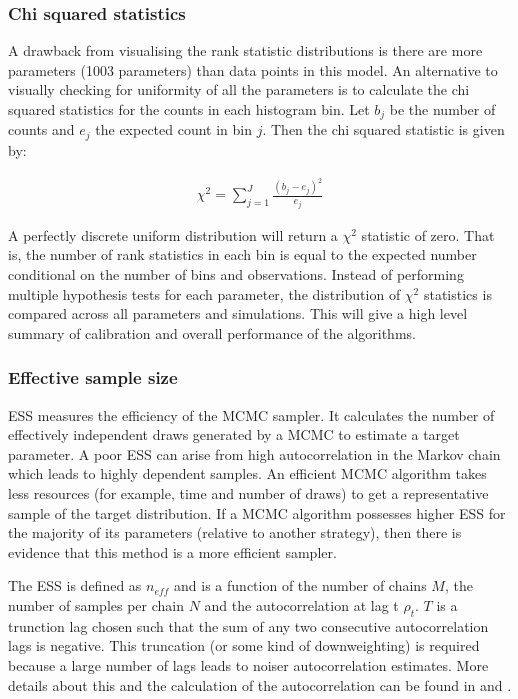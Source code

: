 \documentclass[12pt, a4paper]{article}
\begin{document}
            \subsubsection{Chi squared statistics}
            A drawback from visualising the rank statistic distributions is there are more parameters (1003 parameters) than data points in this model. An alternative to visually checking for uniformity of all the parameters is to calculate the chi squared statistics for the counts in each histogram bin. Let $b_j$ be the number of counts and $e_j$ the expected count in bin $j$. Then the chi squared statistic is given by:
            
            $$
            \begin{aligned}
            \chi^2 = \sum_{j=1}^J \frac{(b_{j} - e_{j})^2}{e_j}
            \end{aligned}
            $$
            
            A perfectly discrete uniform distribution will return a $\chi^2$ statistic of zero. That is, the number of rank statistics in each bin is equal to the expected number conditional on the number of bins and observations. Instead of performing multiple hypothesis tests for each parameter, the distribution of $\chi^2$ statistics is compared across all parameters and simulations. This will give a high level summary of calibration and overall performance of the algorithms.

            \subsubsection{Effective sample size}
            ESS measures the efficiency of the MCMC sampler. It calculates the number of effectively independent draws generated by a MCMC to estimate a target parameter. A poor ESS can arise from high autocorrelation in the Markov chain which leads to highly dependent samples. An efficient MCMC algorithm takes less resources (for example, time and number of draws) to get a representative sample of the target distribution. If a MCMC algorithm possesses higher ESS for the majority of its parameters (relative to another strategy), then there is evidence that this method is a more efficient sampler.
            
            The ESS is defined as $n_{eff}$ and is a function of the number of chains $M$, the number of samples per chain $N$ and the autocorrelation at lag t $\rho_t$. $T$ is a trunction lag chosen such that the sum of any two consecutive autocorrelation lags is negative. This truncation (or some kind of downweighting) is required because a large number of lags leads to noiser autocorrelation estimates. More details about this and the calculation of the autocorrelation can be found in \citep{vehtari2021rank} and \citet{geyer1992practical}.
\end{document}

